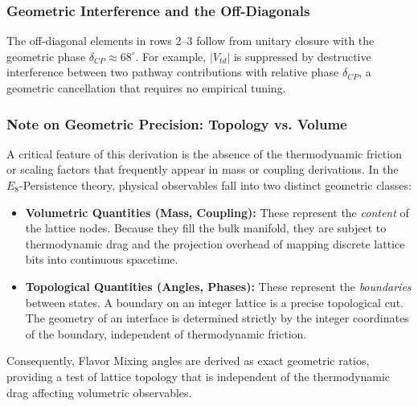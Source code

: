 \subsubsection{Geometric Interference and the Off-Diagonals}
The off-diagonal elements in rows 2--3 follow from unitary closure with the geometric phase $\delta_{CP} \approx 68^\circ$. For example, $|V_{td}|$ is suppressed by destructive interference between two pathway contributions with relative phase $\delta_{CP}$, a geometric cancellation that requires no empirical tuning.

\subsubsection{Note on Geometric Precision: Topology vs. Volume}
A critical feature of this derivation is the absence of the thermodynamic friction or scaling factors that frequently appear in mass or coupling derivations. In the $E_8$-Persistence theory, physical observables fall into two distinct geometric classes:
\begin{itemize}
    \item \textbf{Volumetric Quantities (Mass, Coupling):} These represent the \textit{content} of the lattice nodes. Because they fill the bulk manifold, they are subject to thermodynamic drag and the projection overhead of mapping discrete lattice bits into continuous spacetime.
    \item \textbf{Topological Quantities (Angles, Phases):} These represent the \textit{boundaries} between states. A boundary on an integer lattice is a precise topological cut. The geometry of an interface is determined strictly by the integer coordinates of the boundary, independent of thermodynamic friction.
\end{itemize}
Consequently, Flavor Mixing angles are derived as exact geometric ratios, providing a test of lattice topology that is independent of the thermodynamic drag affecting volumetric observables.



